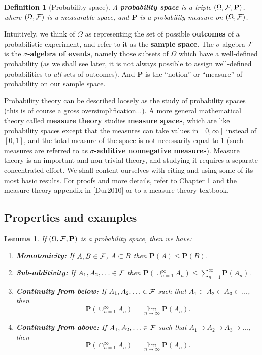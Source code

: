 \documentclass[12pt]{article}
\newtheorem{lemma}[thm]{Lemma}
\newtheorem{defi}[thm]{Definition}
\newcommand{\prob}{\mathbf{P}}
\theoremstyle{example}
\begin{document}
\begin{defi}[Probability space] A \textbf{probability space} is a triple $(\Omega, {\cal F}, \prob)$, where $(\Omega, {\cal F})$ is a measurable space, and $\prob$ is a probability measure on $(\Omega, {\cal F})$.
\end{defi}

Intuitively, we think of $\Omega$ as representing the set of possible \textbf{outcomes} of a probabilistic experiment, and refer to it as the \textbf{sample space}. The $\sigma$-algebra ${\cal F}$ is the \textbf{$\sigma$-algebra of events}, namely those subsets of $\Omega$ which have a well-defined probability (as we shall see later, it is not always possible to assign well-defined probabilities to \emph{all} sets of outcomes). And $\prob$ is the ``notion'' or ``measure'' of probability on our sample space.

\bigskip \noindent
Probability theory can be described loosely as the study of probability spaces (this is of course a gross oversimplification...). A more general mathematical theory called \textbf{measure theory} studies \textbf{measure spaces}, which are like probability spaces except that the measures can take values in $[0,\infty]$ instead of $[0,1]$, and the total measure of the space is not necessarily equal to $1$ (such measures are referred to as \textbf{$\sigma$-additive nonnegative measures}). Measure theory is an important and non-trivial theory, and studying it requires a separate concentrated effort. We shall content ourselves with citing and using some of its most basic results. For proofs and more details, refer to Chapter 1 and the measure theory appendix in [Dur2010] or to a measure theory textbook.

\subsection{Properties and examples}

\begin{lemma} If $(\Omega, {\cal F}, \prob)$ is a probability space, then we have:
\renewcommand{\labelenumi}{(\roman{enumi})}
\begin{enumerate}
\item \textbf{Monotonicity:} If $A,B \in {\cal F}$, $A\subset B$ then $\prob(A)\le \prob(B)$.
\item \textbf{Sub-additivity:} If $A_1,A_2,\ldots \in {\cal F}$ then 
$\prob(\cup_{n=1}^\infty A_n) \le \sum_{n=1}^\infty \prob(A_n)$.
\item \textbf{Continuity from below:} If $A_1,A_2,\ldots \in {\cal F}$ such that $A_1 \subset A_2 \subset A_3 \subset \ldots$, then
$$ \prob(\cup_{n=1}^\infty A_n) = \lim_{n\to\infty} \prob(A_n). $$
\item \textbf{Continuity from above:} If $A_1,A_2,\ldots \in {\cal F}$ such that $A_1 \supset A_2 \supset A_3 \supset \ldots$, then
$$ \prob(\cap_{n=1}^\infty A_n) = \lim_{n\to\infty} \prob(A_n). $$
\end{enumerate}
\label{lem-probspaceproperties}
\end{lemma}
\end{document}
